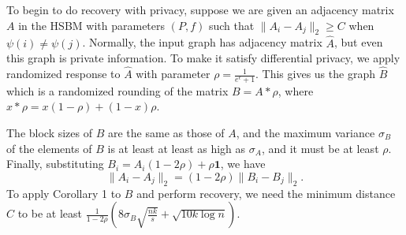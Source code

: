 To begin to do recovery with privacy, suppose we are given an adjacency matrix $A$ in the HSBM with parameters $(P,f)$ such that $\|A_i - A_j\|_2 \geq C$ when $\psi(i) \neq \psi(j)$. Normally, the input graph has adjacency matrix $\hat{A}$, but even this graph is private information. To make it satisfy differential privacy, we apply randomized response to $\hat{A}$ with parameter $\rho = \frac{1}{e^\epsilon + 1}$. This gives us the graph $\hat{B}$ which is a randomized rounding of the matrix $B = A * \rho$, where $x * \rho = x (1-\rho) + (1-x) \rho$. 

The block sizes of $B$ are the same as those of $A$, and the maximum variance $\sigma_B$ of the elements of $B$ is at least at least as high as $\sigma_A$, and it must be at least $\rho$. Finally, substituting $B_i = A_i(1-2\rho) + \rho \textbf{1}$, we have
\[
    \|A_i - A_j\|_2 = (1-2\rho)\|B_i - B_j\|_2.
\]
To apply Corollary 1 to $B$ and perform recovery, we need the minimum distance $C$ to be at least $\frac{1}{1-2\rho}\left(8 \sigma_B \sqrt{\frac{nk}{s}} + \sqrt{10k \log n}\right)$.
\fi 
\fi
